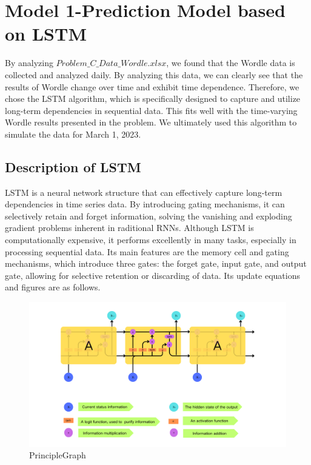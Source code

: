 \documentclass{mcmthesis}  %
\begin{document}
\section{Model 1-Prediction Model based on LSTM}  %

By analyzing \textbf{$Problem\_C\_Data\_Wordle.xlsx$}, we found that the Wordle data is 
collected and analyzed daily. By analyzing this data, we can clearly 
see that the results of Wordle change over time and exhibit time dependence. 
Therefore, we chose the LSTM algorithm, which is specifically designed to 
capture and utilize long-term dependencies in sequential data. This fits 
well with the time-varying Wordle results presented in the problem. We 
ultimately used this algorithm to simulate the data for March 1, 2023.

\subsection{Description of LSTM}
LSTM is a neural network structure that can effectively capture long-term dependencies 
in time series data. By introducing gating mechanisms, it can selectively retain and 
forget information, solving the vanishing and exploding gradient problems inherent in 
raditional RNNs. Although LSTM is computationally expensive, it performs excellently in 
many tasks, especially in processing sequential data. Its main features are the memory 
cell and gating mechanisms, which introduce three gates: the forget gate, input gate, 
and output gate, allowing for selective retention or discarding of data. Its update equations 
and figures are as follows.
\begin{figure}[htbp]  %
        \small
        \centering  %
        \includegraphics[width=12cm]{figure/C.png}  %
        \caption{PrincipleGraph} \label{Figure1}  %
        \end{figure}  %
\end{document}
